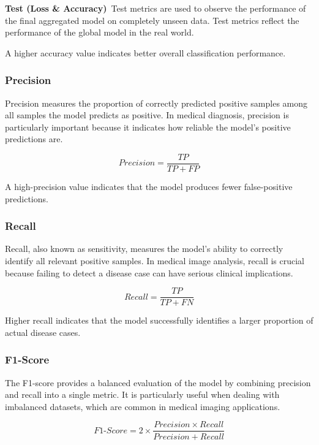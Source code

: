 \documentclass[12pt]{book}
\begin{document}
\textbf{Test (Loss & Accuracy)}\
Test metrics are used to observe the performance of the final aggregated model on completely unseen data. Test metrics reflect the performance of the global model in the real world.\

A higher accuracy value indicates better overall classification performance.

\subsubsection{Precision}

Precision measures the proportion of correctly predicted positive samples among all samples the model predicts as positive. In medical diagnosis, precision is particularly important because it indicates how reliable the model’s positive predictions are.

\begin{equation}
Precision = \frac{TP}{TP + FP}
\end{equation}

A high-precision value indicates that the model produces fewer false-positive predictions.

\subsubsection{Recall}

Recall, also known as sensitivity, measures the model's ability to correctly identify all relevant positive samples. In medical image analysis, recall is crucial because failing to detect a disease case can have serious clinical implications.

\begin{equation}
Recall = \frac{TP}{TP + FN}
\end{equation}

Higher recall indicates that the model successfully identifies a larger proportion of actual disease cases.

\subsubsection{F1-Score}

The F1-score provides a balanced evaluation of the model by combining precision and recall into a single metric. It is particularly useful when dealing with imbalanced datasets, which are common in medical imaging applications.

\begin{equation}
F1\text{-}Score = 2 \times \frac{Precision \times Recall}{Precision + Recall}
\end{equation}
\end{document}
